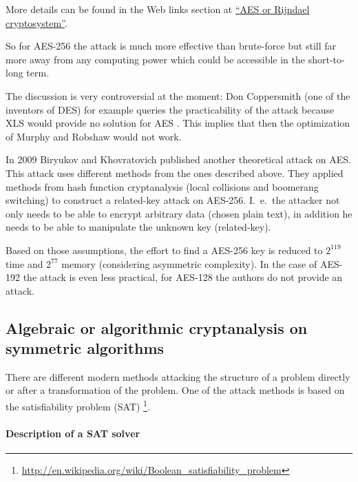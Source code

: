 More details can be found in the Web links section at
\hyperlink{CM_HT_Weblink_Rijndael-Cryptosystem}{``AES or Rijndael cryptosystem''}.

So for AES-256 the attack is much more effective than brute-force but still far more away from any computing power which could be accessible in the short-to-long term. 

The discussion is very controversial at the moment: Don Coppersmith (one of the
inventors of DES) for example queries the practicability of the attack because
XLS would provide no solution for AES \cite{cm:Coppersmith2002}. This implies that
then the optimization of Murphy and Robshaw \cite{cm:Robshaw2002b} would not work.

In 2009 Biryukov and Khovratovich \cite{cm:Biryukov2009} published another
theoretical attack on AES. This attack uses different methods from the ones
described above. They applied methods from hash function cryptanalysis (local
collisions and boomerang switching) to construct a related-key attack on
AES-256. I.~e.\ the attacker not only needs to be able to encrypt arbitrary data
(chosen plain text), in addition he needs to be able to manipulate the unknown key
(related-key). 

Based on those assumptions, the effort to find a AES-256 key is reduced to
$2^{119}$ time and $2^{77}$ memory (considering asymmetric complexity).
In the case of AES-192 the attack is even less practical, for AES-128
the authors do not provide an attack.


\subsection{Algebraic or algorithmic cryptanalysis on symmetric algorithms}
\label{Algebraic-gegen-Symmetr}

There are different modern methods attacking the structure of a problem directly or after a transformation of the problem. One of the attack methods is based on the satisfiability problem (SAT)%
\footnote{%
 \url{http://en.wikipedia.org/wiki/Boolean_satisfiability_problem}
}.


\paragraph*{Description of a SAT solver}\mbox{}
\hypertarget{ht_SAT-Solver}{}

